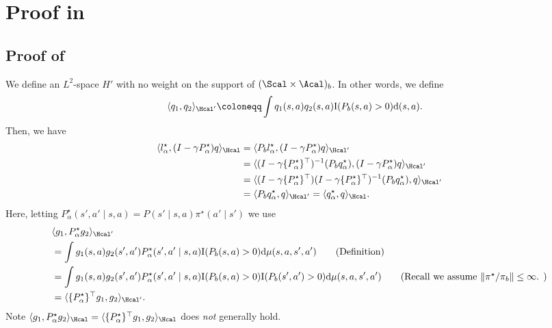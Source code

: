\section{Proof in }


\subsection{Proof of }




We define an $L^2$-space $H'$ with no weight on the support of $(\Scal \times \Acal)_b$. In other words, we define 
\begin{align*}
    \langle q_1, q_2 \rangle_{\Hcal'} &\coloneqq \int q_1(s,a)q_2(s,a)\mathrm{I}(P_b(s,a)>0)\mathrm{d}(s,a). 
\end{align*}
Then, we have 
\begin{align*}
   \langle  l^{\star}_{\alpha} , (I- \gamma P^{\star}_{\alpha}) q \rangle_{\Hcal}  &= \langle  P_b l^{\star}_{\alpha} , (I - \gamma P^{\star}_{\alpha}) q \rangle_{\Hcal'}  \\ 
    &= \langle  (I-\gamma \{P^{\star}_{\alpha}\}^{\top})^{-1} (P_bq^{\star}_{\alpha}),(I - \gamma P^{\star}_{\alpha}) q \rangle_{\Hcal'} \\
    &= \langle  (I-\gamma \{P^{\star}_{\alpha}\}^{\top})(I-\gamma \{P^{\star}_{\alpha}\}^{\top})^{-1}(P_b q^{\star}_{\alpha}), q \rangle_{\Hcal'} \\
    &= \langle P_b q^{\star}_{\alpha} ,q \rangle_{\Hcal'}= \langle q^{\star}_{\alpha}, q \rangle_{\Hcal}. 
\end{align*}
Here, letting $P^{\star}_{\alpha}(s',a' \mid s,a)=P(s'\mid s,a)\pi^{\star}(a'\mid s')$ we use 
\begin{align*}
    &\langle g_1,  P^{\star}_{\alpha}g_2 \rangle_{\Hcal'}\\
    &=\int g_1(s,a)g_2(s',a')P^{\star}_{\alpha}(s',a' \mid s,a)\mathrm{I}(P_b(s,a)>0)\mathrm{d}\mu(s,a,s',a') \tag{Definition} \\ 
    &=\int g_1(s,a)g_2(s',a')P^{\star}_{\alpha}(s',a' \mid s,a)\mathrm{I}(P_b(s,a)>0)\mathrm{I}(P_b(s',a')>0)\mathrm{d}\mu(s,a,s',a') \tag{Recall we assume $\|\pi^{\star}/\pi_b\|\leq \infty$. } \\ 
    &=\langle \{P^{\star}_{\alpha}\}^{\top}g_1, g_2 \rangle_{\Hcal'}. 
\end{align*}
Note $\langle g_1,  P^{\star}_{\alpha}g_2 \rangle_{\Hcal}=\langle \{P^{\star}_{\alpha}\}^{\top}g_1, g_2 \rangle_{\Hcal}$ does \emph{not} generally hold. 






